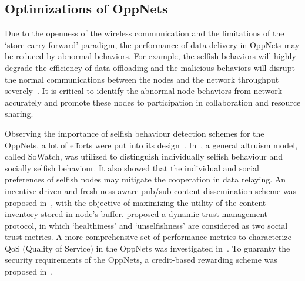 \subsection{Optimizations of OppNets}
Due to the openness of
the wireless communication and the limitations of the
`store-carry-forward' paradigm,
the performance of data delivery in OppNets may be reduced
by abnormal behaviors.
For example,
the selfish behaviors will highly degrade
the efficiency of data offloading
and the malicious behaviors
will disrupt the
normal communications between the nodes and the network
throughput severely~\cite{DBLP:journals/comsur/JedariXN18}.
It is critical to
identify the abnormal node behaviors from
network accurately and promote these nodes to
participation in collaboration and resource sharing.

Observing the importance of selfish behaviour detection
schemes for the OppNets,
a lot of efforts were
put into its design~\cite{DBLP:journals/fgcs/JedariXCDTA19, Zhou2015Incentive, Chen2014Dynamic, DBLP:journals/tdsc/ChoC18, Wang2016A}.
In~\cite{DBLP:journals/fgcs/JedariXCDTA19},
a general altruism model,
called SoWatch,
was utilized to
distinguish individually selfish behaviour and socially selfish behaviour.
It also showed that the individual and social preferences of selfish nodes
may mitigate the cooperation in data relaying.
An incentive-driven and fresh-ness-aware pub/sub content dissemination scheme
was proposed in~\cite{Zhou2015Incentive},
with the objective of maximizing the utility of the content inventory stored in node's buffer.
\cite{Chen2014Dynamic} proposed a dynamic trust management protocol,
in which `healthiness' and
`unselfishness' are considered as two social trust metrics.
A more comprehensive set of performance metrics to characterize QoS (Quality of Service)
in the OppNets
was investigated in~\cite{DBLP:journals/tdsc/ChoC18}.
To guaranty the security requirements of the OppNets,
a credit-based
rewarding scheme was proposed in~\cite{Wang2016A}.

